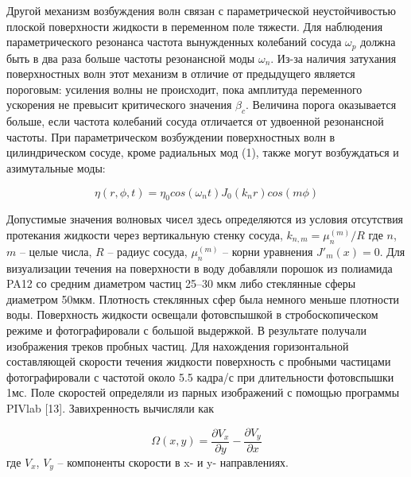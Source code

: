 Другой механизм возбуждения волн связан с параметрической неустойчивостью плоской поверхности жидкости в переменном поле тяжести. Для наблюдения параметрического резонанса частота вынужденных колебаний сосуда $\omega_p$ должна быть в два раза больше частоты резонансной моды $\omega_n$. Из-за наличия затухания поверхностных волн этот механизм в отличие от предыдущего является пороговым: усиления волны не происходит, пока амплитуда переменного ускорения не превысит критического значения $\beta_c$. Величина порога оказывается больше, если частота колебаний сосуда отличается от удвоенной резонансной частоты. При параметрическом возбуждении поверхностных волн в цилиндрическом сосуде, кроме радиальных мод (1), также могут возбуждаться и азимутальные моды:

\begin{equation}
\eta(r, \phi, t) = \eta_0 cos(\omega_n t) J_0(k_n r) cos(m \phi)
\end{equation}

Допустимые значения волновых чисел здесь определяются из условия отсутствия протекания жидкости через вертикальную стенку сосуда, $k_{n, m} = \mu_n^{(m)}/R$
где $n$, $m$ – целые числа, $R$ – радиус сосуда, $\mu_n^{(m)}$ – корни уравнения $J'_m(x) = 0$. Для визуализации течения на поверхности в воду добавляли порошок из полиамида PA12 со средним диаметром частиц 25–30 мкм либо стеклянные сферы диаметром 50мкм. Плотность стеклянных сфер была немного меньше плотности воды. Поверхность жидкости освещали фотовспышкой в стробоскопическом режиме и фотографировали с большой выдержкой. В результате получали изображения треков пробных частиц. Для нахождения горизонтальной составляющей скорости течения жидкости поверхность с пробными частицами фотографировали с частотой около 5.5 кадра/с при длительности фотовспышки 1мс. Поле скоростей определяли из парных изображений с помощью программы PIVlab [13]. Завихренность вычисляли как

\begin{equation}
\Omega(x, y) = \frac{\partial V_x}{\partial y} - \frac{\partial V_y}{\partial x}
\end{equation}
где $V_x$, $V_y$ – компоненты скорости в x- и y- направлениях. 


